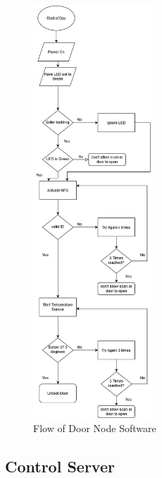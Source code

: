 \begin{figure}[!htb]
\centering
\includegraphics[width=0.4\textwidth]{images/door-interface-flow.png}
\caption{Flow of Door Node Software}
\end{figure}

\subsection{Control Server}

